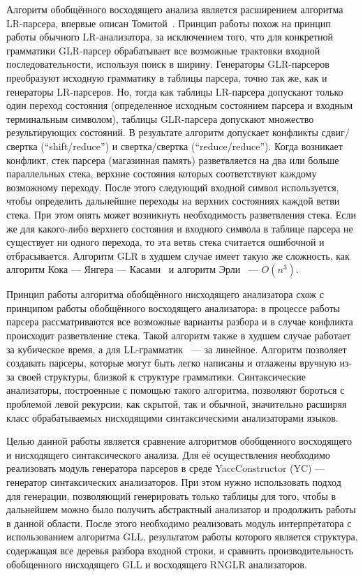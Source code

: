 Алгоритм обобщённого восходящего анализа является расширением алгоритма LR-парсера, впервые описан Томитой~\cite{tomita}. Принцип работы похож на принцип работы обычного LR-анализатора, за исключением того, что для конкретной грамматики GLR-парсер обрабатывает все возможные трактовки входной последовательности, используя поиск в ширину. Генераторы GLR-парсеров преобразуют исходную грамматику в таблицы парсера, точно так же, как и генераторы LR-парсеров. Но, тогда как таблицы LR-парсера допускают только один переход состояния (определенное исходным состоянием парсера и входным терминальным символом), таблицы GLR-парсера допускают множество результирующих состояний. В результате алгоритм допускает конфликты сдвиг/свертка (“shift/reduce”) и свертка/свертка (“reduce/reduce”). Когда возникает конфликт, стек парсера (магазинная память) разветвляется на два или больше параллельных стека, верхние состояния которых соответствуют каждому возможному переходу. После этого следующий входной символ используется, чтобы определить дальнейшие переходы на верхних состояниях каждой ветви стека. При этом опять может возникнуть необходимость разветвления стека. Если же для какого-либо верхнего состояния и входного символа в таблице парсера не существует ни одного перехода, то эта ветвь стека считается ошибочной и отбрасывается. Алгоритм GLR в худшем случае имеет такую же сложность, как алгоритм Кока --- Янгера --- Касами~\cite{earley2} и алгоритм Эрли~\cite{earley} --- $O(n^3)$.

Принцип работы алгоритма обобщённого нисходящего анализатора схож с принципом работы обобщённого восходящего анализатора: в процессе работы парсера рассматриваются все возможные варианты разбора и в случае конфликта происходит разветвление стека. Такой алгоритм также в худшем случае работает за кубическое время, а для LL-грамматик~\cite{aho} --- за линейное. Алгоритм позволяет создавать парсеры, которые могут быть легко написаны и отлажены вручную из-за своей структуры, близкой к структуре грамматики. Синтаксические анализаторы, построенные с помощью такого алгоритма, позволяют бороться с проблемой левой рекурсии, как скрытой, так и обычной, значительно расширяя класс обрабатываемых нисходящими синтаксическими анализаторами языков.

Целью данной работы является сравнение алгоритмов обобщенного восходящего и нисходящего синтаксического анализа. Для её осуществления необходимо реализовать модуль генератора парсеров в среде YaccConstructor (YC) --- генератор синтаксических анализаторов. При этом нужно использовать подход для генерации, позволяющий генерировать только таблицы для того, чтобы в дальнейшем можно было получить абстрактный анализатор и продолжить работы в данной области. После этого необходимо реализовать модуль интерпретатора с использованием алгоритма GLL, результатом работы которого является структура, содержащая все деревья разбора входной строки, и сравнить производительность обобщенного нисходящего GLL и восходящего RNGLR анализаторов.
